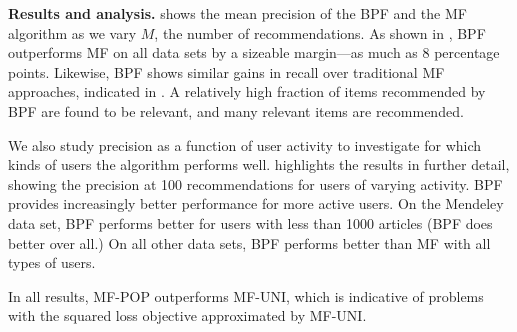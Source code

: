 {\bf Results and analysis.}  shows the mean
precision of the BPF and the MF algorithm as we vary $M$, the number
of recommendations. As shown in , BPF
outperforms MF on all data sets by a sizeable margin---as much as 8
percentage points. Likewise, BPF shows similar gains in recall over
traditional MF approaches, indicated in . A
relatively high fraction of items recommended by BPF are found to be
relevant, and many relevant items are recommended.

We also study precision as a function of user activity to investigate
for which kinds of users the algorithm performs
well.  highlights the results in
further detail, showing the precision at 100 recommendations for users
of varying activity. BPF provides increasingly better performance for
more active users.  On the Mendeley data set, BPF performs better for
users with less than 1000 articles (BPF does better over all.)  On all
other data sets, BPF performs better than MF with all types of users.

In all results, MF-POP outperforms MF-UNI, which is indicative of
problems with the squared loss objective approximated by MF-UNI.




